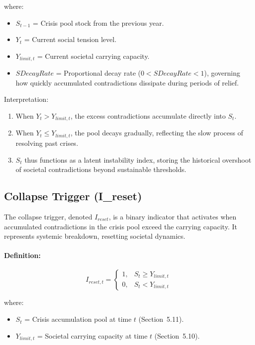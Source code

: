 \documentclass[12pt,a4paper]{article}
\begin{document}
\noindent where:
\begin{itemize}
    \item $S_{t-1}$ = Crisis pool stock from the previous year.
    \item $Y_t$ = Current social tension level.
    \item $Y_{limit,t}$ = Current societal carrying capacity.
    \item $SDecayRate$ = Proportional decay rate ($0 < SDecayRate < 1$), 
          governing how quickly accumulated contradictions dissipate 
          during periods of relief.
\end{itemize}

\noindent Interpretation:
\begin{enumerate}
    \item When $Y_t > Y_{limit,t}$, the excess contradictions accumulate directly into $S_t$.
    \item When $Y_t \leq Y_{limit,t}$, the pool decays gradually, reflecting the 
          slow process of resolving past crises.
    \item $S_t$ thus functions as a latent instability index, storing the historical 
          overshoot of societal contradictions beyond sustainable thresholds.
\end{enumerate}
\subsection{Collapse Trigger (I\_reset)}

The collapse trigger, denoted $I_{reset}$, is a binary indicator that activates 
when accumulated contradictions in the crisis pool exceed the carrying capacity. 
It represents systemic breakdown, resetting societal dynamics.

\paragraph{Definition:}
\begin{equation}
I_{reset,t} =
\begin{cases}
1, & S_t \geq Y_{limit,t} \\
0, & S_t < Y_{limit,t}
\end{cases}
\end{equation}

\noindent where:
\begin{itemize}
    \item $S_t$ = Crisis accumulation pool at time $t$ (Section~5.11).
    \item $Y_{limit,t}$ = Societal carrying capacity at time $t$ (Section~5.10).
\end{itemize}
\end{document}
